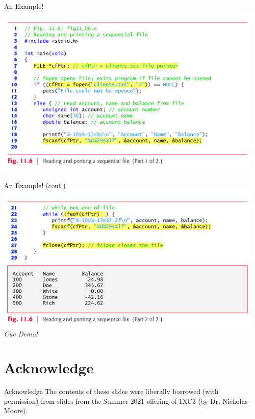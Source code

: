\documentclass[11pt]{beamer}
\let\OldTexttt\texttt
\renewcommand{\texttt}[1]{\OldTexttt{\color{teal}{#1}}}
\begin{document}
\begin{frame}{An Example!}
\center
\includegraphics[scale=0.12]{ioex.png}
\end{frame}

\begin{frame}{An Example! (cont.)}
\center
\includegraphics[scale=0.12]{ioex2.png}
\emph{Cue Demo!}
\end{frame}


\section[Acknowledge]{Acknowledge}
\begin{frame}{Acknowledge}
\center
\vspace{8em}
The contents of these slides were liberally borrowed (with permission) from slides from the Summer 2021 offering of 1XC3 (by Dr. Nicholas Moore).  
\end{frame}
\end{document}
